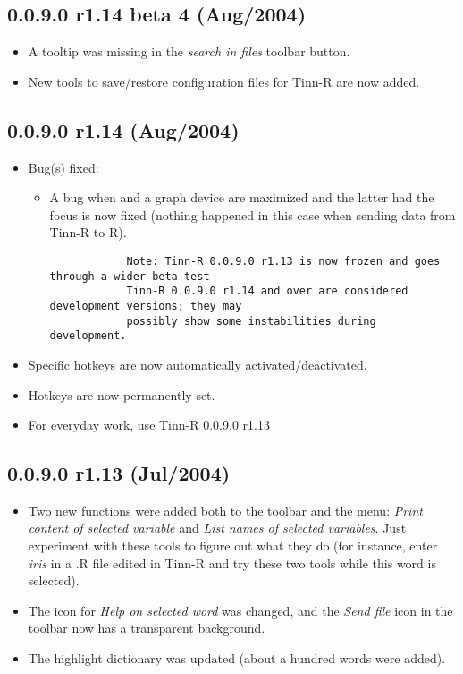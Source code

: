\subsection*{0.0.9.0 r1.14 beta 4 (Aug/2004)}
\begin{itemize}
  \item A tooltip was missing in the \textit{search in files} toolbar button.
  \item New tools to save/restore configuration files for Tinn-R are now added.
\end{itemize}


\subsection*{0.0.9.0 r1.14 (Aug/2004)}
\begin{itemize}
  \item Bug(s) fixed:
    \begin{itemize}
      \item A bug when \RR{} and a graph device are maximized and the latter had the
        focus is now fixed (nothing happened in this case when sending data from
        Tinn-R to R).

        \begin{footnotesize}
          \begin{verbatim}
            Note: Tinn-R 0.0.9.0 r1.13 is now frozen and goes through a wider beta test
            Tinn-R 0.0.9.0 r1.14 and over are considered development versions; they may
            possibly show some instabilities during development.
          \end{verbatim}
        \end{footnotesize}

    \end{itemize}
  \item Specific \RR{} hotkeys are now automatically activated/deactivated.
  \item Hotkeys are now permanently set.
  \item For everyday work, use Tinn-R 0.0.9.0 r1.13
\end{itemize}


\subsection*{0.0.9.0 r1.13 (Jul/2004)}
\begin{itemize}
  \item Two new functions were added both to the \RR{} toolbar and the \RR{} menu:
    \textit{Print content of selected variable} and \textit{List names of selected variables}.
    Just experiment with these tools to figure out what they do (for instance,
    enter \textit{iris} in a .R file edited in Tinn-R and try these two tools while this word is selected).
  \item The icon for \textit{Help on selected word} was changed, and the \textit{Send file} icon in the \RR{}
    toolbar now has a transparent background.
  \item The \RR{} highlight dictionary was updated (about a hundred words were added).
\end{itemize}



